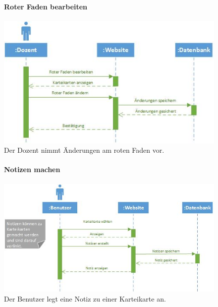 \documentclass[12pt,a4paper]{article}
\begin{document}
\begin{figure}[H]
	\centering
	\paragraph{Roter Faden bearbeiten}
	\includegraphics[width=\textwidth]{Bilder/Sequenzdiagramme/RoterFadenBearbeiten1.jpg}
	\caption{Der Dozent nimmt Änderungen am roten Faden vor.}
	\label{SzRoterFaden}
\end{figure}
\begin{figure}[H]
	\centering
	\paragraph{Notizen machen}
	\includegraphics[width=\textwidth]{Bilder/Sequenzdiagramme/NotizenMachen1.jpg}
	\caption{Der Benutzer legt eine Notiz zu einer Karteikarte an.}
	\label{SzNotizenMachen}
\end{figure}
\end{document}
